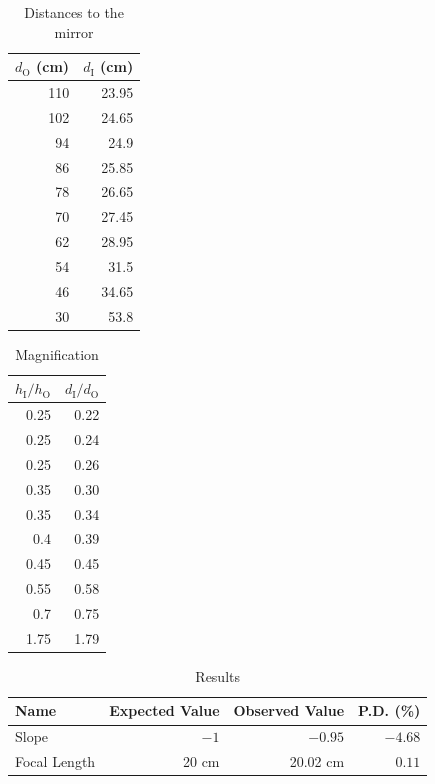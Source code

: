 \begin{table}[ht]
    \centering
    \begin{tabular}{|r|r|}
        \hline
        $d_{\text{O}}$ (cm) & $d_{\text{I}}$ (cm) \\
        \hline
        110 & 23.95 \\
        102 & 24.65 \\
        94 & 24.9 \\
        86 & 25.85 \\
        78 & 26.65 \\
        70 & 27.45 \\
        62 & 28.95 \\
        54 & 31.5 \\
        46 & 34.65 \\
        30 & 53.8 \\
        \hline
    \end{tabular}
    \caption{Distances to the mirror}
    \label{table.07.distance}
\end{table}
%
\begin{table}[ht]
    \centering
    \begin{tabular}{|r|r|}
        \hline
        $h_{\text{I}} / h_{\text{O}}$ & $d_{\text{I}} / d_{\text{O}}$ \\
        \hline
        0.25 & 0.22 \\
        0.25 & 0.24 \\
        0.25 & 0.26 \\
        0.35 & 0.30 \\
        0.35 & 0.34 \\
        0.4 & 0.39 \\
        0.45 & 0.45 \\
        0.55 & 0.58 \\
        0.7 & 0.75 \\
        1.75 & 1.79 \\
        \hline
    \end{tabular}
    \caption{Magnification}
    \label{table.07.magnification}
\end{table}
%
\begin{table}[ht]
    \centering
    \begin{tabular}{|l|r|r|r|}
        \hline
        Name & Expected Value & Observed Value & P.D. (\%) \\
        \hline
        Slope & $-1$ & $-0.95$ & $-4.68$ \\
        Focal Length & 20 cm & 20.02 cm & $0.11$ \\
        \hline
    \end{tabular}
    \caption{Results}
    \label{table.07.results}
\end{table}
%
\newpage
\FloatBarrier
